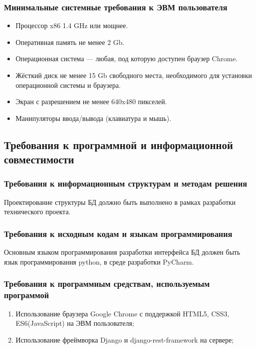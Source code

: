     \subsubsection{Минимальные системные требования к ЭВМ пользователя}
      \begin{itemize}
        \item Процессор x86 1.4 GHz или мощнее.
        \item Оперативная память не менее 2 Gb.
        \item Операционная система — любая, под которую доступен браузер Chrome.
        \item Жёсткий диск не менее 15 Gb свободного места, необходимого для установки операционной системы и браузера.
        \item Экран с разрешением не менее 640x480 пикселей.
        \item Манипуляторы ввода/вывода (клавиатура и мышь).
      \end{itemize}
  \subsection{Требования к программной и информационной совместимости}
    \subsubsection{Требования к информационным структурам и методам решения}
      Проектирование структуры БД должно быть выполнено в рамках разработки технического проекта.
    \subsubsection{Требования к исходным кодам и языкам программирования}
      Основным языком программирования разработки интерфейса БД должен быть язык программирования python, в среде разработки PyCharm.
    \subsubsection{Требования к программным средствам, используемым программой}
    \begin{enumerate}
      \item Использование браузера Google Chrome с поддержкой HTML5, CSS3, ES6(JavaScript) на ЭВМ пользователя;
      \item Использование фреймворка Django и django-rest-framework на сервере; 
    \end{enumerate}
